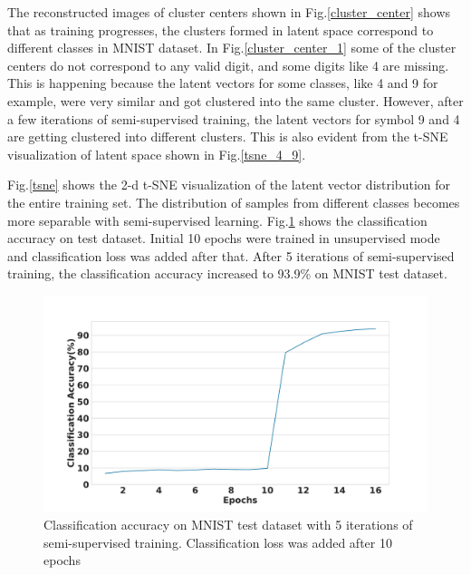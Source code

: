 \documentclass[runningheads]{llncs}
\begin{document}
The reconstructed images of cluster centers shown in Fig.\ref{cluster_center} shows that as training progresses, the clusters formed in latent space correspond to different classes in MNIST dataset.
In Fig.\ref{cluster_center_1} some of the cluster centers do not correspond to any valid digit, and some digits like 4  are missing.
This is happening because the latent vectors for some classes, like  4 and 9 for example,  were very similar and got clustered into the same cluster.
However, after a few iterations of semi-supervised training, the latent vectors for symbol 9 and 4 are getting clustered into different clusters.
This is also evident from the t-SNE visualization of latent space shown in Fig.\ref{tsne_4_9}.

Fig.\ref{tsne} shows the 2-d t-SNE visualization of the latent vector distribution for the entire training set.
The distribution of samples from different classes becomes more separable with semi-supervised learning.
Fig.\ref{classificaion_acc} shows the  classification accuracy on test dataset.
Initial 10 epochs were trained in unsupervised mode and classification loss was added after that.
After 5 iterations of semi-supervised training, the classification accuracy increased to 93.9\% on MNIST test dataset.

\begin{figure}[!t]
\centering
  \centering
  \includegraphics[width=.6\linewidth]{images/classification_acc_semi_supervised}
\caption{Classification accuracy on MNIST test dataset with 5 iterations of semi-supervised training. Classification loss was added after 10 epochs}
\label{classificaion_acc}
\end{figure}
\end{document}

